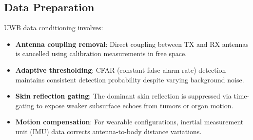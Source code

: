 \documentclass[journal,twoside]{IEEEtran}
\begin{document}
\subsection{Data Preparation}
UWB data conditioning involves:
\begin{itemize}
\item \textbf{Antenna coupling removal}: Direct coupling between TX and RX antennas is cancelled using calibration measurements in free space.
\item \textbf{Adaptive thresholding}: CFAR (constant false alarm rate) detection maintains consistent detection probability despite varying background noise.
\item \textbf{Skin reflection gating}: The dominant skin reflection is suppressed via time-gating to expose weaker subsurface echoes from tumors or organ motion.
\item \textbf{Motion compensation}: For wearable configurations, inertial measurement unit (IMU) data corrects antenna-to-body distance variations.
\end{itemize}
\end{document}
